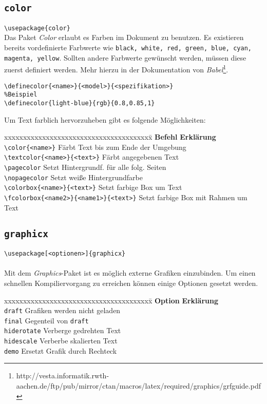 \subsection{\texttt{color}}
\verb=\usepackage{color}=\\
Das Paket \textsl{Color} erlaubt es Farben im Dokument zu benutzen. Es existieren bereits vordefinierte Farbwerte wie \verb=black, white, red, green, blue, cyan, magenta, yellow=. Sollten andere Farbwerte gewünscht werden, müssen diese zuerst definiert werden. Mehr hierzu in der Dokumentation von \textsl{Babel}\footnote{http://vesta.informatik.rwth-aachen.de/ftp/pub/mirror/ctan/macros/latex/required/graphics/grfguide.pdf}.
\begin{lstlisting}[caption={Color, Farbdefinition}]
\definecolor{<name>}{<model>}{<spezifikation>}
%Beispiel
\definecolor{light-blue}{rgb}{0.8,0.85,1}
\end{lstlisting}
Um Text farblich hervorzuheben gibt es folgende Möglichkeiten:
\begin{tabbing}
xxxxxxxxxxxxxxxxxxxxxxxxxxxxxxxxxxxxxxx\=\kill
\textbf{Befehl}							\>\textbf{Erklärung}\\
\verb=\color{<name>}=					\>Färbt Text bis zum Ende der Umgebung\\
\verb=\textcolor{<name>}{<text>}=			\>Färbt angegebenen Text\\
\verb=\pagecolor=						\>Setzt Hintergrundf. für alle folg. Seiten\\
\verb=\nopagecolor=						\>Setzt weiße Hintergrundfarbe\\
\verb=\colorbox{<name>}{<text>}=			\>Setzt farbige Box um Text\\
\verb=\fcolorbox{<name2>}{<name1>}{<text>}=	\>Setzt farbige Box mit Rahmen um Text\\
\end{tabbing}
\subsection{\texttt{graphicx}}
\verb=\usepackage[<optionen>]{graphicx}=\\
\\
Mit dem \textsl{Graphics}-Paket ist es möglich externe Grafiken einzubinden. Um einen schnellen Kompiliervorgang zu erreichen können einige Optionen gesetzt werden.
\begin{tabbing}
xxxxxxxxxxxxxxxxxxxxxxxxxxxxxxxxxxxxxxx\=\kill
\textbf{Option}			\>\textbf{Erklärung}\\
\verb=draft=			\>Grafiken werden nicht geladen\\
\verb=final=			\>Gegenteil von \verb=draft=\\
\verb=hiderotate=		\>Verberge gedrehten Text\\
\verb=hidescale=			\>Verberbe skalierten Text\\
\verb=demo=			\>Ersetzt Grafik durch Rechteck\\
\end{tabbing}

